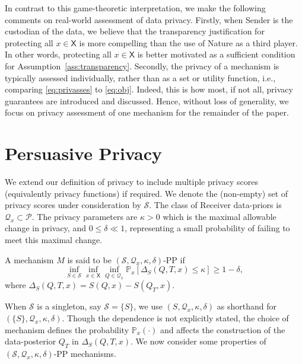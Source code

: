 \documentclass{article}
\theoremstyle{plain}
\theoremstyle{plain}
\theoremstyle{definition}
\theoremstyle{remark}
\theoremstyle{plain}
\renewcommand{\Pr}{\mathbb{P}}
\newcommand{\PrMx}{\Pr_{x}}
\newcommand{\xset}{\mathsf{X}}
\begin{document}
In contrast to this game-theoretic interpretation, we make the following comments on real-world assessment of data privacy. Firstly, when Sender is the custodian of the data, we believe that the transparency justification for protecting all $x \in \xset$ is more compelling than the use of Nature as a third player. In other words, protecting all $x \in \xset$ is better motivated as a sufficient condition for Assumption~\ref{ass:transparency}. Secondly, the privacy of a mechanism is typically assessed individually, rather than as a set or utility function, i.e., comparing \eqref{eq:privasses} to \eqref{eq:obj}. Indeed, this is how most, if not all, privacy guarantees are introduced and discussed. Hence, without loss of generality, we focus on privacy assessment of one mechanism for the remainder of the paper.

\section{Persuasive Privacy}\label{sec:def}
We extend our definition of privacy to include multiple privacy scores (equivalently privacy functions) if required. We denote the (non-empty) set of privacy scores under consideration by $\mathcal{S}$. The class of Receiver data-priors is $\mathcal{Q}_x \subset \mathcal{P}$. The privacy parameters are $\kappa >0$ which is the maximal allowable change in privacy, and $0\leq \delta\ll 1$, representing a small probability of failing to meet this maximal change.
\begin{definition}\label{def:pp}
    A mechanism $M$ is said to be $(\mathcal{S},\mathcal{Q}_x,\kappa,\delta)$-PP if \begin{equation}\label{eq:privacyobj}
     \inf_{S \in \mathcal{S}}\inf_{x \in \xset}\inf_{Q \in \mathcal{Q}_x}\PrMx\left[\Delta_S(Q,T,x) \leq \kappa \right] \geq 1 - \delta,
\end{equation}
where $\Delta_S(Q,T,x) = S(Q,x) - S(Q_T,x)$.
\end{definition}
When $\mathcal{S}$ is a singleton, say $\mathcal{S} = \{S\}$, we use $(S,\mathcal{Q}_x,\kappa,\delta)$ as shorthand for $(\{S\},\mathcal{Q}_x,\kappa,\delta)$.
Though the dependence is not explicitly stated, the choice of mechanism defines the probability $\mathbb{P}_x(\cdot)$ and affects the construction of the data-posterior $Q_T$ in $\Delta_S(Q,T,x)$. 
We now consider some properties of $(\mathcal{S},\mathcal{Q}_x,\kappa,\delta)$-PP mechanisms.
\end{document}
